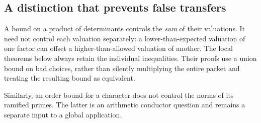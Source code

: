 \subsection{A distinction that prevents false transfers}
A bound on a product of determinants controls the \emph{sum} of their valuations. It need not control each valuation separately: a lower-than-expected valuation of one factor can offset a higher-than-allowed valuation of another. The local theorems below always retain the individual inequalities. Their proofs use a union bound on bad choices, rather than silently multiplying the entire packet and treating the resulting bound as equivalent.

Similarly, an order bound for a character does not control the norms of its ramified primes. The latter is an arithmetic conductor question and remains a separate input to a global application.

